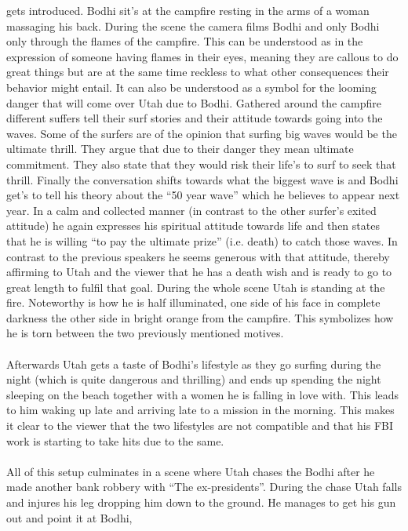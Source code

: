 \documentclass[fleqn,14pt]{article}
\begin{document}
gets introduced. Bodhi sit's at the campfire resting in the arms of a woman massaging his back. During the scene the camera films Bodhi and only Bodhi only through the flames of the campfire.
This can be understood as in the expression of someone having flames in their eyes, meaning they are callous to do great things but are at the same time reckless to
what other consequences their behavior might entail. It can also be understood as a symbol for the looming danger that will come over Utah due to Bodhi. Gathered around
the campfire different suffers tell their surf stories and their attitude towards going into the waves. Some of the surfers are of the opinion that surfing big waves would be
the ultimate thrill. They argue that due to their danger they mean ultimate commitment. They also state that they would risk their life's to surf to seek that thrill.
Finally the conversation shifts towards what the biggest wave is and Bodhi get's to tell his theory about the “50 year wave” which he believes to appear next year.
In a calm and collected manner (in contrast to the other surfer's exited attitude) he again expresses his spiritual attitude towards life and then states that he is willing 
“to pay the ultimate prize” (i.e. death) to catch those waves. In contrast to the previous speakers he seems generous with that attitude, thereby affirming to Utah and the viewer 
that he has a death wish and is ready to go to great length to fulfil that goal. During the whole scene Utah is standing at the fire. Noteworthy is how he is half illuminated,
one side of his face in complete darkness the other side in bright orange from the campfire. This symbolizes how he is torn between the two previously mentioned motives.\\
\\
Afterwards Utah gets a taste of Bodhi's lifestyle as they go surfing during the night (which is quite dangerous and thrilling) and ends up spending the night
sleeping on the beach together with a women he is falling in love with. This leads to him waking up late and arriving late to a mission in the morning.
This makes it clear to the viewer that the two lifestyles are not compatible and that his FBI work is starting to take hits due to the same.\\
\\
All of this setup culminates in a scene where Utah chases the Bodhi after he made another bank robbery with “The ex-presidents”.
During the chase Utah falls and injures his leg dropping him down to the ground. He manages to get his gun out and point it at Bodhi,
\end{document}
